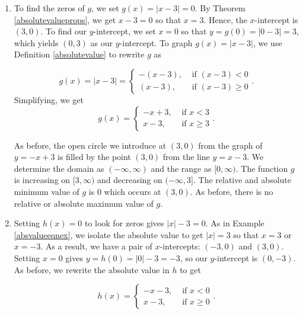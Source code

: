 {\begin{enumerate}
By projecting the graph to the $x$-axis, we see that the domain is $(-\infty, \infty)$.  Projecting to the $y$-axis gives us the range $[0,\infty)$.  The function is increasing on $[0,\infty)$ and decreasing on $(-\infty,0]$.  The relative minimum value of $f$ is the same as the absolute minimum, namely $0$ which occurs at $(0,0)$.  There is no relative maximum value of $f$.  There is also no absolute maximum value of $f$, since the $y$ values on the graph extend infinitely upwards.

\item  To find the zeros of $g$, we set $g(x) = |x-3|=0$.  By Theorem \ref{absolutevalueprops}, we get $x-3=0$ so that $x=3$.  Hence, the $x$-intercept is $(3,0)$.  To find our $y$-intercept, we set $x=0$ so that $y = g(0) = |0-3| = 3$, which yields $(0,3)$ as our $y$-intercept.  To graph $g(x) = |x-3|$, we use Definition \ref{absolutevalue} to rewrite $g$ as

\[ g(x) = |x-3| =  \begin{cases} -(x-3), & \mbox{ if }  (x-3) < 0  \\
								  (x-3), & \mbox{ if }  (x-3) \geq 0
					\end{cases}.
\]
Simplifying, we get
\[
 g(x) = \begin{cases} -x+3, & \mbox{ if }  x<3  \\
 					   x-3, & \mbox{ if }  x \geq 3
 		\end{cases}.
\]

As before, the open circle we introduce at $(3,0)$ from the graph of $y = -x+3$ is filled by the point $(3,0)$ from the line $y = x-3$. We determine the domain as $(-\infty, \infty)$ and the range as $[0,\infty)$.  The function $g$ is increasing on $[3,\infty)$ and decreasing on $(-\infty,3]$.  The relative and absolute minimum value of $g$ is $0$ which occurs at $(3,0)$.  As before, there is no relative or absolute maximum value of $g$.

\item  Setting $h(x) = 0$ to look for zeros gives $|x|-3=0$. As in Example \ref{absvalueeqnex},  we isolate the absolute value to get  $|x| = 3$ so that $x =3$ or $x=-3$.  As a result, we have a pair of $x$-intercepts:  $(-3,0)$ and $(3,0)$.  Setting $x=0$ gives $y = h(0) = |0|-3 = -3$, so our $y$-intercept is $(0,-3)$.  As before, we rewrite the absolute value in $h$ to get

\[
 h(x) = \begin{cases} -x-3, & \mbox{ if }  x<0  \\
						 x-3, & \mbox{ if }  x \geq 0 
		\end{cases}.
\]


\end{enumerate}}
